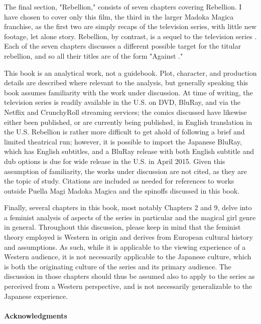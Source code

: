 The final section, "Rebellion," consists of seven chapters covering Rebellion. I have chosen to cover only this film, the third in the larger Madoka Magica franchise, as the first two are simply recaps of the television series, with little new footage, let alone story. Rebellion, by contrast, is a sequel to the television series \cite{ref10}. Each of the seven chapters discusses a different possible target for the titular rebellion, and so all their titles are of the form "Against \underline{\makebox[1cm]{}}."

This book is an analytical work, not a guidebook. Plot, character, and production details are described where relevant to the analysis, but generally speaking this book assumes familiarity with the work under discussion. At time of writing, the television series is readily available in the U.S. on DVD, BluRay, and via the Netflix and CrunchyRoll streaming services; the comics discussed have likewise either been published, or are currently being published, in English translation in the U.S. Rebellion is rather more difficult to get ahold of following a brief and limited theatrical run; however, it is possible to import the Japanese BluRay, which has English subtitles, and a BluRay release with both English subtitle and dub options is due for wide release in the U.S. in April 2015. Given this assumption of familiarity, the works under discussion are not cited, as they are the topic of study. Citations are included as needed for references to works outside Puella Magi Madoka Magica and the spinoffs discussed in this book.

Finally, several chapters in this book, most notably Chapters 2 and 9, delve into a feminist analysis of aspects of the series in particular and the magical girl genre in general. Throughout this discussion, please keep in mind that the feminist theory employed is Western in origin and derives from European cultural history and assumptions. As such, while it is applicable to the viewing experience of a Western audience, it is not necessarily applicable to the Japanese culture, which is both the originating culture of the series and its primary audience. The discussion in those chapters should thus be assumed also to apply to the series as perceived from a Western perspective, and is not necessarily generalizable to the Japanese experience.

\paragraph{Acknowledgments}~{}

